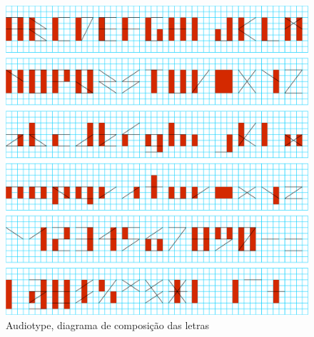 \begin{figure}[!ht]
    
        \includegraphics[width=1\linewidth]{pictures/cap3/audiotype}
        \vspace{-10pt}
    \caption{Audiotype, diagrama de composição das letras}
    \label{fig:audiotype}
\end{figure} 






